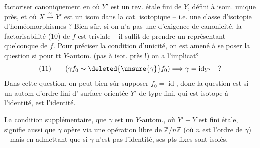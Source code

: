 factoriser \uline{canoniquement} en
où $Y'$ est un rev. étale fini de $Y$, défini à isom. unique près, et où $X\xrightarrow{\sim}Y'$ est un isom dans la cat. isotopique -- i.e. une classe d'isotopie d'homéomorphismes ? Bien sûr, si on n'a pas une d'exigence de canonicité, la factorisabilité (10) de $f$ est triviale -- il suffit de prendre un représentant quelconque de $f$.  Pour préciser la  condition d'unicité, on est amené à se poser la question si pour tt $Y$-autom.    (\uline{pas} à isot. près !)  on a l'implicat°
\[
(11)\qquad (\gamma f_0\sim\deleted{\unsure{\gamma}}f_0)\Longrightarrow\gamma=\operatorname{id}_{Y'}\quad ?
\]
Dans cette question, on peut bien sûr supposer $f_0=\operatorname{id}$, donc la question est si un autom d'ordre fini \inserted{$\gamma$} d'  surface orientée $Y'$ de type fini, qui est isotope à l'identité, est l'identité.

La condition supplémentaire, que $\gamma$ est un $Y$-autom., où $Y'\mathbin{-}Y$ est fini étale, signifie aussi que $\gamma$ opère via une opération \uline{libre} de $\mathbb{Z}/n\mathbb{Z}$ (où $n$ est l'ordre de $\gamma$) -- mais en admettant que si $\gamma$  n'est pas l'identité, ses pts fixes sont isolés,
